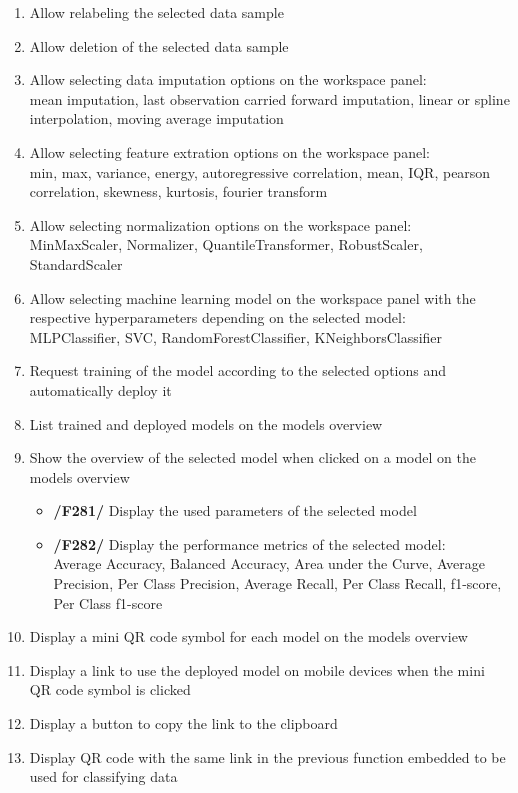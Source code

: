 \begin{enumerate}[{label = \textbf{/F{\protect\twodigits{\arabic{enumi}}}0/}, leftmargin = *}]
    \item Allow relabeling the selected data sample
    \item Allow deletion of the selected data sample
    \item Allow selecting data imputation options on the workspace panel: \\mean imputation, last observation carried forward imputation, linear or spline interpolation, moving average imputation
    \item Allow selecting feature extration options on the workspace panel: \\min, max, variance, energy, autoregressive correlation, mean, IQR, pearson correlation, skewness, kurtosis, fourier transform
    \item Allow selecting normalization options on the workspace panel: \\MinMaxScaler, Normalizer, QuantileTransformer, RobustScaler, StandardScaler
    \item Allow selecting machine learning model on the workspace panel with the respective hyperparameters depending on the selected model: \\MLPClassifier, SVC, RandomForestClassifier, KNeighborsClassifier
    \item Request training of the model according to the selected options and automatically deploy it
    \item List trained and deployed models on the models overview
    \item Show the overview of the selected model when clicked on a model on the models overview
    \begin{itemize}
        \item \textbf{/F281/} Display the used parameters of the selected model
        \item \textbf{/F282/} Display the performance metrics of the selected model: \\Average Accuracy, Balanced Accuracy, Area under the Curve, Average Precision, Per Class Precision, Average Recall, Per Class Recall, f1-score, Per Class f1-score
    \end{itemize}
    \item Display a mini QR code symbol for each model on the models overview
    \item Display a link to use the deployed model on mobile devices when the mini QR code symbol is clicked
    \item Display a button to copy the link to the clipboard
    \item Display QR code with the same link in the previous function embedded to be used for classifying data
\end{enumerate}

